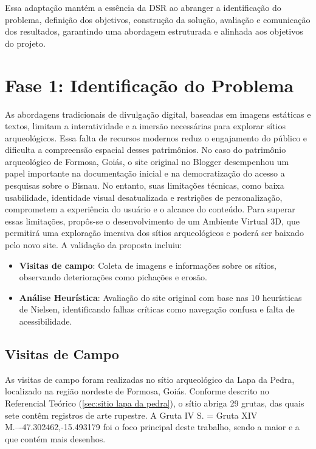 Essa adaptação mantém a essência da DSR ao abranger a identificação do problema, definição dos objetivos, construção da solução, avaliação e comunicação dos resultados, garantindo uma abordagem estruturada e alinhada aos objetivos do projeto.

\section{Fase 1: Identificação do Problema}\label{definicao_do_problema}
As abordagens tradicionais de divulgação digital, baseadas em imagens estáticas e textos, limitam a interatividade e a imersão necessárias para explorar sítios arqueológicos. Essa falta de recursos modernos reduz o engajamento do público e dificulta a compreensão espacial desses patrimônios.
No caso do patrimônio arqueológico de Formosa, Goiás, o site original no Blogger desempenhou um papel importante na documentação inicial e na democratização do acesso a pesquisas sobre o Bisnau. No entanto, suas limitações técnicas, como baixa usabilidade, identidade visual desatualizada e restrições de personalização, comprometem a experiência do usuário e o alcance do conteúdo.
Para superar essas limitações, propôs-se o desenvolvimento de um Ambiente Virtual 3D, que permitirá uma exploração imersiva dos sítios arqueológicos e poderá ser baixado pelo novo site. A validação da proposta incluiu:

\begin{itemize}
\item \textbf{Visitas de campo}: Coleta de imagens e informações sobre os sítios, observando deteriorações como pichações e erosão.
\item \textbf{Análise Heurística}: Avaliação do site original com base nas 10 heurísticas de Nielsen, identificando falhas críticas como navegação confusa e falta de acessibilidade.
\end{itemize}

\subsection{Visitas de Campo}
As visitas de campo foram realizadas no sítio arqueológico da Lapa da Pedra, localizado na região nordeste de Formosa, Goiás. Conforme descrito no Referencial Teórico (\ref{sec:sitio lapa da pedra}), o sítio abriga 29 grutas, das quais sete contêm registros de arte rupestre. A Gruta IV S. = Gruta XIV M.–-47.302462,-15.493179 foi o foco principal deste trabalho, sendo a maior e a que contém mais desenhos.

